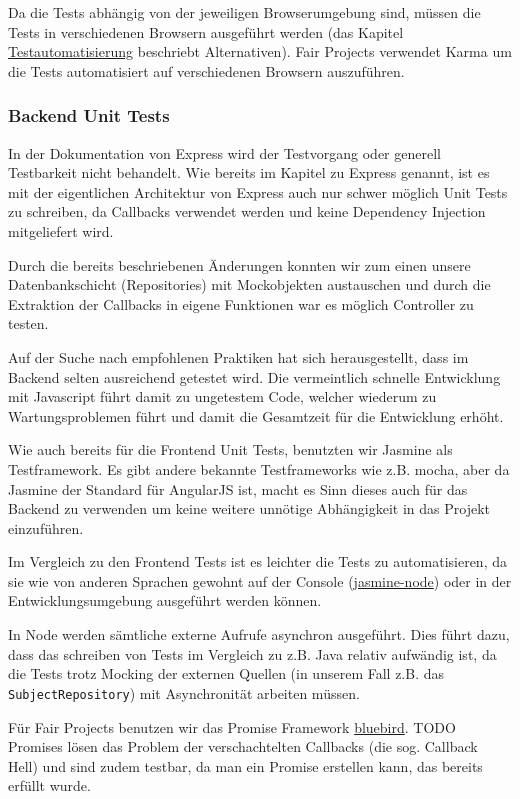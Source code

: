 Da die Tests abhängig von der jeweiligen Browserumgebung sind, müssen
die Tests in verschiedenen Browsern ausgeführt werden (das Kapitel
\url{Testautomatisierung} beschriebt Alternativen). Fair Projects
verwendet Karma\cite{karma} um
die Tests automatisiert auf verschiedenen Browsern auszuführen.

\subsubsection{Backend Unit Tests}\label{backend-unit-tests}

In der Dokumentation von Express wird der Testvorgang oder generell
Testbarkeit nicht behandelt\cite{express-no-tests}. Wie bereits im Kapitel zu Express genannt,
ist es mit der eigentlichen Architektur von Express auch nur schwer
möglich Unit Tests zu schreiben, da Callbacks verwendet werden und keine
Dependency Injection mitgeliefert wird.

Durch die bereits beschriebenen Änderungen konnten wir zum einen unsere
Datenbankschicht (Repositories) mit Mockobjekten austauschen und durch
die Extraktion der Callbacks in eigene Funktionen war es möglich
Controller zu testen.

Auf der Suche nach empfohlenen Praktiken hat sich herausgestellt, dass
im Backend selten ausreichend getestet wird. Die vermeintlich schnelle
Entwicklung mit Javascript führt damit zu ungetestem Code, welcher
wiederum zu Wartungsproblemen führt und damit die Gesamtzeit für die Entwicklung erhöht.

Wie auch bereits für die Frontend Unit Tests, benutzten wir Jasmine als
Testframework. Es gibt andere bekannte Testframeworks wie z.B.
mocha\cite{mocha}, aber da Jasmine der Standard für
AngularJS ist, macht es Sinn dieses auch für das Backend zu verwenden um
keine weitere unnötige Abhängigkeit in das Projekt einzuführen.

Im Vergleich zu den Frontend Tests ist es leichter die Tests zu
automatisieren, da sie wie von anderen Sprachen gewohnt auf der Console
(\href{https://github.com/mhevery/jasmine-node}{jasmine-node}) oder in
der Entwicklungsumgebung ausgeführt werden können.

In Node werden sämtliche externe Aufrufe asynchron ausgeführt. Dies
führt dazu, dass das schreiben von Tests im Vergleich zu z.B. Java
relativ aufwändig ist, da die Tests trotz Mocking der externen Quellen
(in unserem Fall z.B. das \texttt{SubjectRepository}) mit Asynchronität
arbeiten müssen.

Für Fair Projects benutzen wir das Promise Framework
\href{http://bluebirdjs.com/}{bluebird}. TODO Promises lösen das Problem
der verschachtelten Callbacks (die sog. Callback Hell) und sind zudem
testbar, da man ein Promise erstellen kann, das bereits erfüllt wurde.

